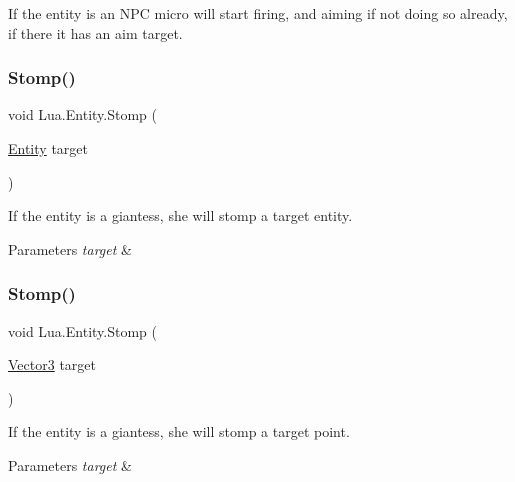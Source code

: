 If the entity is an N\+PC micro will start firing, and aiming if not doing so already, if there it has an aim target. 

\mbox{\label{class_lua_1_1_entity_a0a8058c8b504215e492471b4e7d557d4}} 
\subsubsection{\texorpdfstring{Stomp()}{Stomp()}\hspace{0.1cm}{\footnotesize\ttfamily [1/2]}}
{\footnotesize\ttfamily void Lua.\+Entity.\+Stomp (\begin{DoxyParamCaption}\item[{\mbox{\hyperlink{class_lua_1_1_entity}{Entity}}}]{target }\end{DoxyParamCaption})}



If the entity is a giantess, she will stomp a target entity. 


\begin{DoxyParams}{Parameters}
{\em target} & \\
\hline
\end{DoxyParams}
\mbox{\label{class_lua_1_1_entity_ad6c8d1dc736aeea69e734d3c1e884343}} 
\subsubsection{\texorpdfstring{Stomp()}{Stomp()}\hspace{0.1cm}{\footnotesize\ttfamily [2/2]}}
{\footnotesize\ttfamily void Lua.\+Entity.\+Stomp (\begin{DoxyParamCaption}\item[{\mbox{\hyperlink{class_lua_1_1_vector3}{Vector3}}}]{target }\end{DoxyParamCaption})}



If the entity is a giantess, she will stomp a target point. 


\begin{DoxyParams}{Parameters}
{\em target} & \\
\hline
\end{DoxyParams}
\mbox{\label{class_lua_1_1_entity_aadc969ba1387cf03d80b8432705f0750}} 
